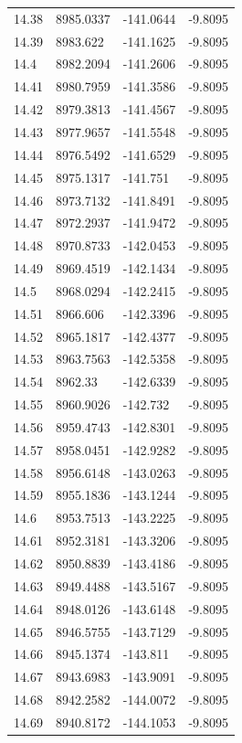 \begin{table}[H]
\begin{tabular}{llll}
14.38 & 8985.0337 & -141.0644 & -9.8095 \\
14.39 & 8983.622 & -141.1625 & -9.8095 \\
14.4 & 8982.2094 & -141.2606 & -9.8095 \\
14.41 & 8980.7959 & -141.3586 & -9.8095 \\
14.42 & 8979.3813 & -141.4567 & -9.8095 \\
14.43 & 8977.9657 & -141.5548 & -9.8095 \\
14.44 & 8976.5492 & -141.6529 & -9.8095 \\
14.45 & 8975.1317 & -141.751 & -9.8095 \\
14.46 & 8973.7132 & -141.8491 & -9.8095 \\
14.47 & 8972.2937 & -141.9472 & -9.8095 \\
14.48 & 8970.8733 & -142.0453 & -9.8095 \\
14.49 & 8969.4519 & -142.1434 & -9.8095 \\
14.5 & 8968.0294 & -142.2415 & -9.8095 \\
14.51 & 8966.606 & -142.3396 & -9.8095 \\
14.52 & 8965.1817 & -142.4377 & -9.8095 \\
14.53 & 8963.7563 & -142.5358 & -9.8095 \\
14.54 & 8962.33 & -142.6339 & -9.8095 \\
14.55 & 8960.9026 & -142.732 & -9.8095 \\
14.56 & 8959.4743 & -142.8301 & -9.8095 \\
14.57 & 8958.0451 & -142.9282 & -9.8095 \\
14.58 & 8956.6148 & -143.0263 & -9.8095 \\
14.59 & 8955.1836 & -143.1244 & -9.8095 \\
14.6 & 8953.7513 & -143.2225 & -9.8095 \\
14.61 & 8952.3181 & -143.3206 & -9.8095 \\
14.62 & 8950.8839 & -143.4186 & -9.8095 \\
14.63 & 8949.4488 & -143.5167 & -9.8095 \\
14.64 & 8948.0126 & -143.6148 & -9.8095 \\
14.65 & 8946.5755 & -143.7129 & -9.8095 \\
14.66 & 8945.1374 & -143.811 & -9.8095 \\
14.67 & 8943.6983 & -143.9091 & -9.8095 \\
14.68 & 8942.2582 & -144.0072 & -9.8095 \\
14.69 & 8940.8172 & -144.1053 & -9.8095 \\

\end{tabular}
\end{table}
